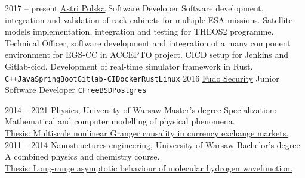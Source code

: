 \documentclass[10pt]{developercv} %
\begin{document}
\hfill %

\begin{entrylist}
	\entry
		{2017 -- present}
		{\href{https://astripolska.pl/}{Astri Polska}}
		{Software Developer}
		{Software development, integration and validation of rack cabinets for multiple ESA missions. Satellite models implementation, integration and testing for THEOS2 programme. Technical Officer, software development and integration of a many component environment for EGS-CC in ACCEPTO project.  CICD setup for Jenkins and Gitlab-cicd. Development of real-time simulator framework in Rust.\\ \texttt{C++}\slashsep\texttt{Java}\slashsep\texttt{SpringBoot}\slashsep\texttt{Gitlab-CI}\slashsep\texttt{Docker}\slashsep\texttt{Rust}\slashsep\texttt{Linux}}
	\entry
		{2016}
		{\href{https://fudosecurity.com/}{Fudo Security}}
		{Junior Software Developer}
		{ \texttt{C}\slashsep\texttt{FreeBSD}\slashsep\texttt{Postgres}}
\end{entrylist}


\begin{minipage}[t]{0.3\textwidth}
\vspace{-\baselineskip}
\begin{barchart}{2.5}
\end{barchart}
\end{minipage}
\begin{minipage}[t]{0.3\textwidth}
\vspace{-\baselineskip}
\begin{barchart}{2.5}
\end{barchart}
\end{minipage}
\begin{minipage}[t]{0.3\textwidth}
\vspace{-\baselineskip}
\begin{barchart}{2.5}
\end{barchart}
\end{minipage}


\begin{entrylist}
	\entry
		{2014 -- 2021}
		{\href{https://www.fuw.edu.pl/}{Physics, University of Warsaw}}
		{Master's degree}
		{Specialization: Mathematical and computer modelling of physical phenomena.\\
		\href{https://github.com/marcinkruk/mgr/blob/master/mkruk-thesis-20210915.pdf}{Thesis: Multiscale nonlinear Granger causality in currency exchange markets.}}
	\entry
		{2011 -- 2014}
		{\href{https://www.fuw.edu.pl/}{Nanostructures engineering, University of Warsaw}}
		{Bachelor's degree}
		{A combined physics and chemistry course.\\
		\href{https://github.com/marcinkruk/mgr/blob/master/lic/mkruk-lic.pdf}{Thesis: Long-range asymptotic behaviour of molecular hydrogen wavefunction.}}
\end{entrylist}
\end{document}
